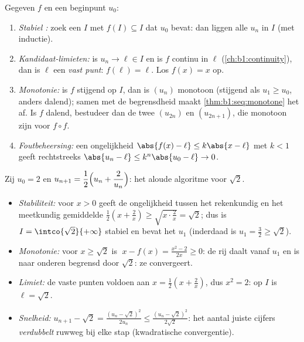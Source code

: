 \begin{method}[$u_{n+1} = f(u_n)$ bestuderen]\label{met:b1:seq:recurrent}
Gegeven $f$ en een beginpunt $u_0$:
\begin{enumerate}
  \item \emph{Stabiel :} zoek een  $I$ met $f(I)
        \subseteq I$ dat $u_0$ bevat: dan liggen alle $u_n$ in $I$ (met
        inductie).
  \item \emph{Kandidaat-limieten:} is $u_n \to \ell \in I$ en is $f$
        continu in $\ell$ (\cref{ch:b1:continuity}), dan is $\ell$ een
        \emph{vast punt}: $f(\ell) = \ell$. Los $f(x) = x$ op.
  \item \emph{Monotonie:} is $f$ stijgend op $I$, dan is $(u_n)$
        monotoon (stijgend als $u_1 \geq u_0$, anders dalend); samen met
        de begrensdheid maakt \cref{thm:b1:seq:monotone} het af. Is $f$
        dalend, bestudeer dan de twee  $(u_{2n})$ en
        $(u_{2n+1})$, die monotoon zijn voor $f \circ f$.
  \item \emph{Foutbeheersing:} een ongelijkheid $\abs{f(x) - \ell} \leq
        k\abs{x - \ell}$ met $k < 1$ geeft rechtstreeks $\abs{u_n -
        \ell} \leq k^n \abs{u_0 - \ell} \to 0$.
\end{enumerate}
\end{method}

\begin{example}\label{ex:b1:seq:heron}
Zij $u_0 = 2$ en $u_{n+1} = \dfrac12\Bigl(u_n + \dfrac{2}{u_n}\Bigr)$:
het aloude algoritme voor $\sqrt 2$.
\begin{itemize}
  \item \emph{Stabiliteit:} voor $x > 0$ geeft de ongelijkheid tussen
        het rekenkundig en het meetkundig gemiddelde $\frac12(x +
        \frac2x) \geq \sqrt{x \cdot \frac 2x} = \sqrt 2$; dus is $I =
        \intco{\sqrt 2}{+\infty}$ stabiel en bevat het $u_1$ (inderdaad
        is $u_1 = \frac32 \geq \sqrt 2$).
  \item \emph{Monotonie:} voor $x \geq \sqrt 2$ is $\;x - f(x) =
        \frac{x^2 - 2}{2x} \geq 0$: de rij daalt vanaf $u_1$ en is naar
        onderen begrensd door $\sqrt 2$: ze convergeert.
  \item \emph{Limiet:} de vaste punten voldoen aan $x = \frac12(x +
        \frac2x)$, dus $x^2 = 2$: op $I$ is $\ell = \sqrt 2$.
  \item \emph{Snelheid:} $u_{n+1} - \sqrt 2 = \frac{(u_n -
        \sqrt2)^2}{2u_n} \leq \frac{(u_n - \sqrt 2)^2}{2\sqrt 2}$: het
        aantal juiste cijfers \emph{verdubbelt} ruwweg bij elke stap
        (kwadratische convergentie).
\end{itemize}
\end{example}

